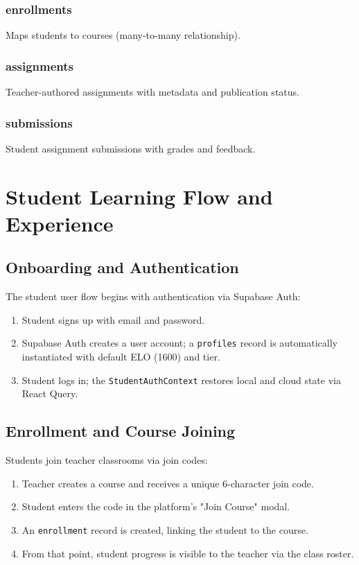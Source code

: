 \documentclass[sigconf,authordraft,twoside]{acmart}
\newcommand{\tech}[1]{\textcolor{brandblue}{\nolinkurl{#1}}}
\begin{document}
\subsubsection{enrollments}
Maps students to courses (many-to-many relationship).

\subsubsection{assignments}
Teacher-authored assignments with metadata and publication status.

\subsubsection{submissions}
Student assignment submissions with grades and feedback.

\section{Student Learning Flow and Experience}

\subsection{Onboarding and Authentication}
The student user flow begins with authentication via Supabase Auth:

\begin{enumerate}
\item Student signs up with email and password.
\item Supabase Auth creates a user account; a \tech{profiles} record is automatically instantiated with default ELO (1600) and tier.
\item Student logs in; the \tech{StudentAuthContext} restores local and cloud state via React Query.
\end{enumerate}

\subsection{Enrollment and Course Joining}
Students join teacher classrooms via join codes:

\begin{enumerate}
\item Teacher creates a course and receives a unique 6-character join code.
\item Student enters the code in the platform's "Join Course" modal.
\item An \tech{enrollment} record is created, linking the student to the course.
\item From that point, student progress is visible to the teacher via the class roster.
\end{enumerate}
\end{document}
